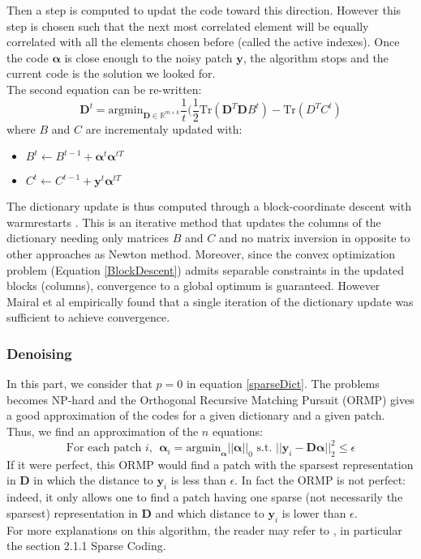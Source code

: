 \documentclass{ipol}
\newcommand{\psize}{m}
\newcommand{\dsize}{k}
\newcommand{\dict}{\textbf{D}}
\newcommand{\code}{\bm{\alpha}}
\newcommand{\pnorm}{p}
\newcommand{\noi}{\textbf{y}}
\newcommand{\RR}{\mathbb{R}}
\newcommand{\argmin}{\text{argmin}}
\begin{document}
Then a step is computed to updat the code toward this direction. However this step is chosen such that the next most correlated element will be equally correlated with all the elements chosen before (called the active indexes). Once the code $\code$ is close enough to the noisy patch $\noi$, the algorithm stops and the current code is the solution we looked for.\\
The second equation can be re-written:
\begin{equation}
	\dict^{t}= \argmin_{\dict \in \RR^{\psize \times \dsize}} \frac{1}{t} (\frac{1}{2} \text{Tr}(\dict^T \dict B^t)- \text{Tr}(D^T C^t )
	\label{BlockDescent}
\end{equation}
where $B$ and $C$ are incrementaly updated with:
\begin{itemize}
	\item $B^t \leftarrow B^{t-1} + \code^t \code^{tT}$
	\item $C^t \leftarrow C^{t-1} + \noi^t \code^{tT}$
\end{itemize}
The dictionary update is thus computed through a block-coordinate descent with warmrestarts \cite{BlockDescent}. This is an iterative method that updates the columns of the dictionary needing only matrices $B$ and $C$ and no matrix inversion in opposite to other approaches as Newton method. Moreover, since the convex optimization problem (Equation \eqref{BlockDescent}) admits separable constraints in the updated blocks (columns), convergence to a global optimum is guaranteed. However Mairal et al empirically found that a single iteration of the dictionary update was sufficient to achieve convergence.

\subsubsection{Denoising}

In this part, we consider that $\pnorm = 0$ in equation \eqref{sparseDict}. The problems becomes NP-hard and the Orthogonal Recursive Matching Pursuit (ORMP) gives a good approximation of the codes for a given dictionary and a given patch. Thus, we find an approximation of the $n$ equations:
\begin{equation}
	\text{For each patch } i, \ \ \code_i = \argmin_{\code} ||\code||_0 \text{ s.t. } ||\noi_i - \dict \code||_2^2 \leq \epsilon
\label{eqORMP}
\end{equation}
If it were perfect, this ORMP would find a patch with the sparsest representation in $\dict$ in which the distance to $\noi_i$ is less than $\epsilon$. In fact the ORMP is not perfect: indeed, it only allows one to find a patch having one sparse (not necessarily the sparsest) representation in $\dict$ and which distance to $\noi_i$ is lower than $\epsilon$.\\
For more explanations on this algorithm, the reader may refer to \cite{KSVD_IPOL}, in particular the section 2.1.1 Sparse Coding.
\end{document}
